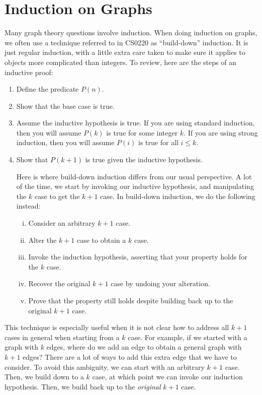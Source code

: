 \documentclass[12pt,letterpaper]{article}
\begin{document}
\newpage
\section*{Induction on Graphs}

Many graph theory questions involve induction. When doing induction on graphs, we often use a technique referred to in CS0220 as ``build-down'' induction. It is just regular induction, with a little extra care taken to make sure it applies to objects more complicated than integers. To review, here are the steps of an inductive proof:

\begin{enumerate}
    \item Define the predicate $P(n)$.

    \item Show that the base case is true.

    \item Assume the inductive hypothesis is true. If you are using standard induction, then you will assume 
		$P(k)$ is true for some integer $k$. If you are using strong induction, then you will assume $P(i)$ is true for all $i \leq k$.

    \item Show that $P(k+1)$ is true given the inductive hypothesis.
    
        Here is where build-down induction differs from our usual perspective. A lot of the time, we start by invoking our inductive hypothesis, and manipulating the $k$ case to get the $k+1$ case. In build-down induction, we do the following instead:

        \begin{enumerate}[i.]
            \item Consider an arbitrary $k+1$ case.
            \item Alter the $k+1$ case to obtain a $k$ case.
            \item Invoke the induction hypothesis, asserting that your property holds for the $k$ case.
            \item Recover the original $k+1$ case by undoing your alteration.
            \item Prove that the property still holds despite building back up to the original $k+1$ case.
        \end{enumerate}
\end{enumerate}

This technique is especially useful when it is not clear how to address all $k+1$ cases in general when starting from a $k$ case. For example, if we started with a graph with $k$ edges, where do we add an edge to obtain a general graph with $k+1$ edges? There are a lot of ways to add this extra edge that we have to consider. To avoid this ambiguity, we can start with an arbitrary $k+1$ case. Then, we build down to a $k$ case, at which point we can invoke our induction hypothesis. Then, we build back up to the \emph{original} $k+1$ case.
\end{document}
